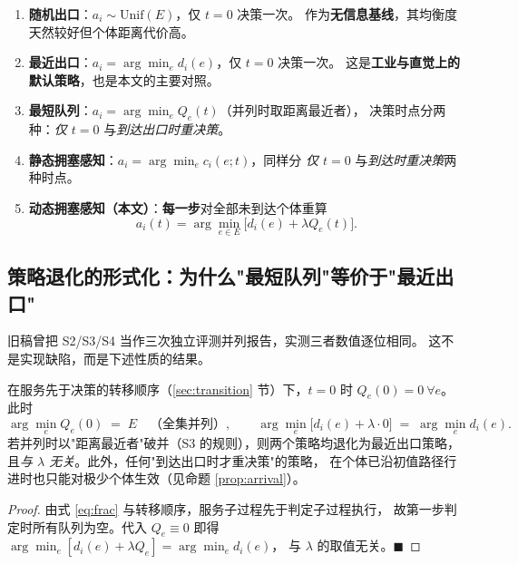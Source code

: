 \begin{enumerate}[label=\textbf{S\arabic*.}]
  \item \textbf{随机出口}：$a_i\sim\text{Unif}(E)$，仅 $t=0$ 决策一次。
        作为\textbf{无信息基线}，其均衡度天然较好但个体距离代价高。
  \item \textbf{最近出口}：$a_i=\arg\min_e d_i(e)$，仅 $t=0$ 决策一次。
        这是\textbf{工业与直觉上的默认策略}，也是本文的主要对照。
  \item \textbf{最短队列}：$a_i=\arg\min_e Q_e(t)$（并列时取距离最近者），
        决策时点分两种：\emph{仅 $t=0$} 与\emph{到达出口时重决策}。
  \item \textbf{静态拥塞感知}：$a_i=\arg\min_e c_i(e;t)$，同样分
        \emph{仅 $t=0$} 与\emph{到达时重决策}两种时点。
  \item \textbf{动态拥塞感知（本文）}：\textbf{每一步}对全部未到达个体重算
        \begin{equation}
          a_i(t)=\arg\min_{e\in E}\bigl[d_i(e)+\lambda Q_e(t)\bigr].
          \label{eq:proposed}
        \end{equation}
\end{enumerate}

\subsection{策略退化的形式化：为什么"最短队列"等价于"最近出口"}
\label{sec:degenerate}

旧稿曾把 S2/S3/S4 当作三次独立评测并列报告，实测三者数值逐位相同。
这不是实现缺陷，而是下述性质的结果。

\begin{csfprop}[命题 1（静态策略的首步退化）]
\label{prop:degenerate}
在服务先于决策的转移顺序（\ref{sec:transition} 节）下，$t=0$ 时
$Q_e(0)=0\ \forall e$。此时
\[
  \arg\min_{e}Q_e(0) \;=\; E
  \quad\text{（全集并列）},
  \qquad
  \arg\min_{e}\bigl[d_i(e)+\lambda\cdot 0\bigr] \;=\; \arg\min_e d_i(e).
\]
若并列时以"距离最近者"破并（S3 的规则），则两个策略均退化为最近出口策略，
且\emph{与 $\lambda$ 无关}。此外，任何"到达出口时才重决策"的策略，
在个体已沿初值路径行进时也只能对极少个体生效（见命题 \ref{prop:arrival}）。
\end{csfprop}

\begin{proof}
由式 \eqref{eq:frac} 与转移顺序，服务子过程先于判定子过程执行，
故第一步判定时所有队列为空。代入 $Q_e\equiv0$ 即得
$\arg\min_e[d_i(e)+\lambda Q_e]=\arg\min_e d_i(e)$，
与 $\lambda$ 的取值无关。\hfill$\blacksquare$
\end{proof}

